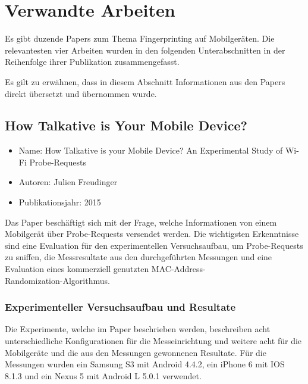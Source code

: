 \section{Verwandte Arbeiten}
Es gibt duzende Papers zum Thema Fingerprinting auf Mobilgeräten.
Die relevantesten vier Arbeiten wurden in den folgenden Unterabschnitten
in der Reihenfolge ihrer Publikation zusammengefasst.

Es gilt zu erwähnen, dass in diesem Abschnitt Informationen aus den Papers
direkt übersetzt und übernommen wurde. 

\subsection{How Talkative is Your Mobile Device?}
\begin{itemize}
    \item Name: How Talkative is your Mobile Device? An Experimental Study of Wi-Fi 
    Probe-Requests
    \item Autoren: Julien Freudinger
    \item Publikationsjahr: 2015
\end{itemize}
Das Paper beschäftigt sich mit der Frage, welche Informationen von einem
Mobilgerät über Probe-Requests versendet werden.
Die wichtigsten Erkenntnisse sind eine Evaluation für den experimentellen
Versuchsaufbau, um Probe-Requests zu sniffen, die Messresultate aus den 
durchgeführten Messungen und eine Evaluation eines kommerziell genutzten 
MAC-Address-\\ Randomization-Algorithmus.

\subsubsection*{Experimenteller Versuchsaufbau und Resultate}
Die Experimente, welche im Paper beschrieben werden, 
beschreiben acht unterschiedliche Konfigurationen für die Messeinrichtung und
weitere acht für die Mobilgeräte und die aus den Messungen gewonnenen Resultate.
Für die Messungen wurden ein Samsung S3 mit Android 4.4.2, 
ein iPhone 6 mit IOS 8.1.3 und ein Nexus 5 mit Android L 5.0.1 verwendet.

\clearpage 


